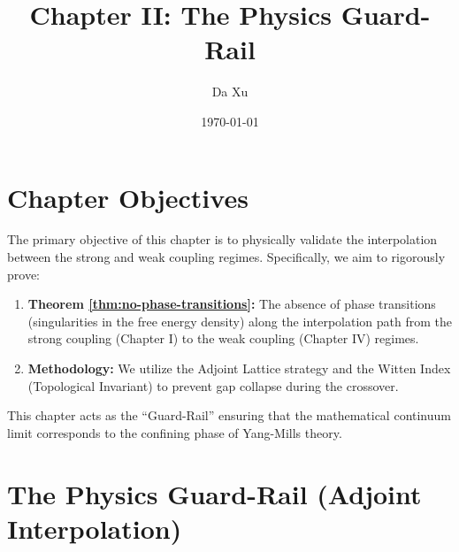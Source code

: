 \documentclass[11pt,a4paper]{report}
\title{Chapter II: The Physics Guard-Rail}
\author{Da Xu}
\date{\today}
\begin{document}
\maketitle
{}

\chapter*{Chapter Objectives}
The primary objective of this chapter is to physically validate the interpolation between the strong and weak coupling regimes. Specifically, we aim to rigorously prove:
\begin{enumerate}
    \item \textbf{Theorem \ref{thm:no-phase-transitions}:} The absence of phase transitions (singularities in the free energy density) along the interpolation path from the strong coupling (Chapter I) to the weak coupling (Chapter IV) regimes.
    \item \textbf{Methodology:} We utilize the Adjoint Lattice strategy and the Witten Index (Topological Invariant) to prevent gap collapse during the crossover.
\end{enumerate}
This chapter acts as the ``Guard-Rail'' ensuring that the mathematical continuum limit corresponds to the confining phase of Yang-Mills theory.

\tableofcontents
\clearpage
{}

\setcounter{chapter}{1}
\chapter{The Physics Guard-Rail (Adjoint Interpolation)}


\appendix










\printbibliography[heading=subbibliography, title={References for Chapter 2}]
\end{document}
